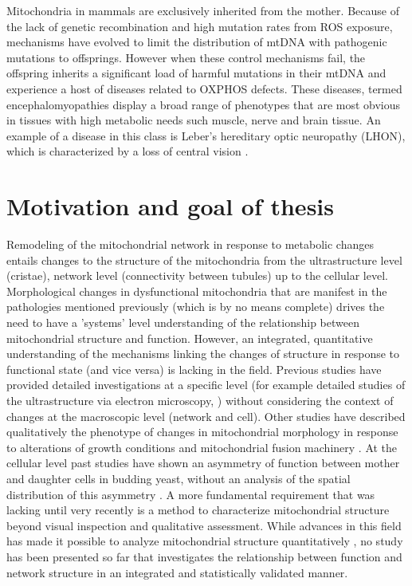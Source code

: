 Mitochondria in mammals are exclusively inherited from the mother. Because of the lack of genetic recombination and high mutation rates from ROS exposure, mechanisms have evolved to limit the distribution of mtDNA with pathogenic mutations to offsprings. However when these control mechanisms fail, the offspring inherits a significant load of harmful mutations in their mtDNA and experience a host of diseases related to OXPHOS defects. These diseases, termed encephalomyopathies display a broad range of phenotypes that are most obvious in tissues with high metabolic needs such muscle, nerve and brain tissue. An example of a disease in this class is Leber's hereditary optic neuropathy (LHON), which is characterized by a loss of central vision \cite{carelli_retinal_2009}.
\section{Motivation and goal of thesis}
Remodeling of the mitochondrial network in response to metabolic changes entails changes to the structure of the mitochondria from the ultrastructure level (cristae), network level (connectivity between tubules) up to the cellular level. Morphological changes in dysfunctional mitochondria that are manifest in the pathologies mentioned previously (which is by no means complete) drives the need to have a 'systems' level understanding of the relationship between mitochondrial structure and function. However, an integrated, quantitative understanding of the mechanisms linking the changes of structure in response to functional state (and vice versa) is lacking in the field. Previous studies have provided detailed investigations at a specific level (for example detailed studies of the ultrastructure via electron microscopy, \cite{vogel_dynamic_2006,bornhovd_mitochondrial_2006}) without considering the context of changes at the macroscopic level (network and cell). Other studies have described qualitatively the phenotype of changes in mitochondrial morphology in response to alterations of growth conditions and mitochondrial fusion machinery \cite{jakobs_spatial_2003,sesaki_division_1999}. At the cellular level past studies have shown an asymmetry of function between mother and daughter cells in budding yeast, without an analysis of the spatial distribution of this asymmetry \cite{aguilaniu_asymmetric_2003,laun_aged_2001}. A more fundamental requirement that was lacking until very recently is a method to characterize mitochondrial structure beyond visual inspection and qualitative assessment. While advances in this field has made it possible to analyze mitochondrial structure quantitatively \cite{rafelski_mitochondrial_2012, sukhorukov_emergence_2012, vowinckel_mitoloc:_2015}, no study has been presented so far that investigates the relationship between function and network structure in an integrated and statistically validated manner.

